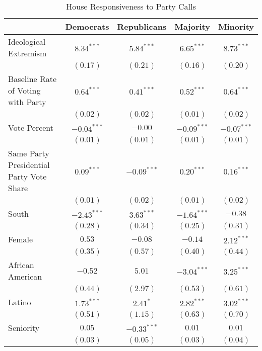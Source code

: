 \documentclass[12pt]{article}
\begin{document}
\begin{table}[H]
	\begin{center}
		\singlespacing
		\small
		\caption{House Responsiveness to Party Calls}
		\begin{tabular}{l c c c c }
			\hline
			& Democrats & Republicans & Majority & Minority \\
			\hline
			Ideological Extremism & $8.34^{***}$  & $5.84^{***}$  & $6.65^{***}$  & $8.73^{***}$  \\
			& $(0.17)$      & $(0.21)$      & $(0.16)$      & $(0.20)$      \\
			Baseline Rate of Voting with Party              & $0.64^{***}$  & $0.41^{***}$  & $0.52^{***}$  & $0.64^{***}$  \\
			& $(0.02)$      & $(0.02)$      & $(0.01)$      & $(0.02)$      \\
			Vote Percent                & $-0.04^{***}$ & $-0.00$       & $-0.09^{***}$ & $-0.07^{***}$ \\
			& $(0.01)$      & $(0.01)$      & $(0.01)$      & $(0.01)$      \\
			Same Party Presidential Party Vote Share          & $0.09^{***}$  & $-0.09^{***}$ & $0.20^{***}$  & $0.16^{***}$  \\
			& $(0.01)$      & $(0.02)$      & $(0.01)$      & $(0.02)$      \\
			South                  & $-2.43^{***}$ & $3.63^{***}$  & $-1.64^{***}$ & $-0.38$       \\
			& $(0.28)$      & $(0.34)$      & $(0.25)$      & $(0.31)$      \\
			Female                 & $0.53$        & $-0.08$       & $-0.14$       & $2.12^{***}$  \\
			& $(0.35)$      & $(0.57)$      & $(0.40)$      & $(0.44)$      \\
			African American                   & $-0.52$       & $5.01$        & $-3.04^{***}$ & $3.25^{***}$  \\
			& $(0.44)$      & $(2.97)$      & $(0.53)$      & $(0.61)$      \\
			Latino                 & $1.73^{***}$  & $2.41^{*}$    & $2.82^{***}$  & $3.02^{***}$  \\
			& $(0.51)$      & $(1.15)$      & $(0.63)$      & $(0.70)$      \\
			Seniority              & $0.05$        & $-0.33^{***}$ & $0.01$        & $0.01$        \\
			& $(0.03)$      & $(0.05)$      & $(0.03)$      & $(0.04)$      \\

\end{tabular}
\end{center}
\end{table}
\end{document}
